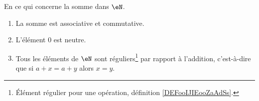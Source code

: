 \begin{proposition}     \label{PROPooTLTSooGNMTmV}
	En ce qui concerne la somme dans \( \eN\).
	\begin{enumerate}
		\item       \label{ITEMooIFFPooXfftfG}
		      La somme est associative et commutative.
		\item       \label{ITEMooSGRVooPAVFYK}
		      L'élément \( 0\) est neutre.
		\item       \label{ITEMooNUTHooJWWzGv}
		      Tous les éléments de \( \eN\) sont réguliers\footnote{Élément régulier pour une opération, définition \ref{DEFooIJIEooZaAdSs}.} par rapport à l'addition, c'est-à-dire que si \( a+x=a+y\) alors \( x=y\).
	\end{enumerate}
\end{proposition}

